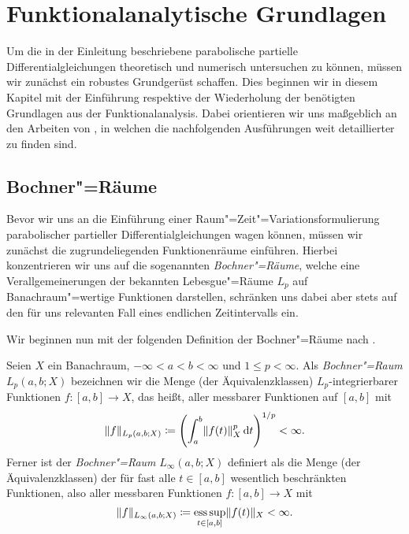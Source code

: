 
\chapter{Funktionalanalytische Grundlagen} %
\label{chapter:grundlagen}

Um die in der Einleitung beschriebene parabolische partielle Differentialgleichungen theoretisch und numerisch untersuchen zu können, müssen wir zunächst ein robustes Grundgerüst schaffen.
Dies beginnen wir in diesem Kapitel mit der Einführung respektive der Wiederholung der benötigten Grundlagen aus der Funktionalanalysis.
Dabei orientieren wir uns maßgeblich an den Arbeiten von \textcite{Dautray:1992by,Schweizer2013}, in welchen die nachfolgenden Ausführungen weit detaillierter zu finden sind.


\section{Bochner"=Räume} %
\label{section:bochner_raeume}

Bevor wir uns an die Einführung einer Raum"=Zeit"=Variationsformulierung parabolischer partieller Differentialgleichungen wagen können, müssen wir zunächst die zugrundeliegenden Funktionenräume einführen.
Hierbei konzentrieren wir uns auf die sogenannten \emph{Bochner"=Räume}, welche eine Verallgemeinerungen der bekannten Lebesgue"=Räume $L_{p}$ auf Banachraum"=wertige Funktionen darstellen, schränken uns dabei aber stets auf den für uns relevanten Fall eines endlichen Zeitintervalls ein.

Wir beginnen nun mit der folgenden Definition der Bochner"=Räume nach \cite[Definition XVIII.1.1]{Dautray:1992by}.

\begin{Definition}
\label{definition:bochner_raum}
    Seien $X$ ein Banachraum, $- \infty < a < b < \infty$ und $1 \leq p < \infty$.
    Als \emph{Bochner"=Raum} $L_{p}(a, b; X)$ bezeichnen wir die Menge (der Äquivalenzklassen) $L_{p}$-integrierbarer Funktionen $f \colon [a, b] \to X$, das heißt, aller messbarer Funktionen auf $[a, b]$ mit
    \begin{equation}
        \lVert f\rVert_{L_{p}(a, b; X)} \coloneqq \left( \int_{a}^{b} \lVert f(t)\rVert_{X}^{p} \mathop{}\!\mathrm{d} t \right)^{1 / p} < \infty.
    \end{equation}
    Ferner ist der \emph{Bochner"=Raum} $L_{\infty}(a, b; X)$ definiert als die Menge (der Äquivalenzklassen) der für fast alle $t \in [a, b]$ wesentlich beschränkten Funktionen, also aller messbaren Funktionen $f \colon [a, b] \to X$ mit
    \begin{equation}
        \lVert f\rVert_{L_{\infty}(a, b; X)} \coloneqq \operatorname*{ess\,sup}_{t \in [a, b]} \lVert f(t)\rVert_{X} < \infty.
    \end{equation}
\end{Definition}

